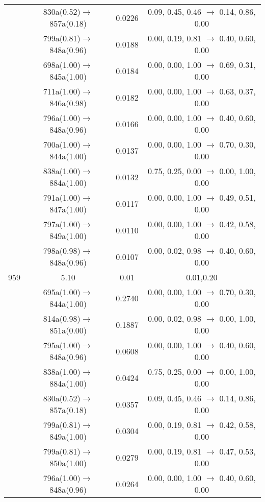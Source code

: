 \documentclass[10pt,a4paper]{article}
\begin{document}
\begin{longtable}{c|c|c|c}
 	& 830a(0.52)$\rightarrow$857a(0.18) &	 0.0226 &	 0.09, 0.45, 0.46 $\rightarrow$ 0.14, 0.86, 0.00 \\ 
 	& 799a(0.81)$\rightarrow$848a(0.96) &	 0.0188 &	 0.00, 0.19, 0.81 $\rightarrow$ 0.40, 0.60, 0.00 \\ 
 	& 698a(1.00)$\rightarrow$845a(1.00) &	 0.0184 &	 0.00, 0.00, 1.00 $\rightarrow$ 0.69, 0.31, 0.00 \\ 
 	& 711a(1.00)$\rightarrow$846a(0.98) &	 0.0182 &	 0.00, 0.00, 1.00 $\rightarrow$ 0.63, 0.37, 0.00 \\ 
 	& 796a(1.00)$\rightarrow$848a(0.96) &	 0.0166 &	 0.00, 0.00, 1.00 $\rightarrow$ 0.40, 0.60, 0.00 \\ 
 	& 700a(1.00)$\rightarrow$844a(1.00) &	 0.0137 &	 0.00, 0.00, 1.00 $\rightarrow$ 0.70, 0.30, 0.00 \\ 
 	& 838a(1.00)$\rightarrow$884a(1.00) &	 0.0132 &	 0.75, 0.25, 0.00 $\rightarrow$ 0.00, 1.00, 0.00 \\ 
 	& 791a(1.00)$\rightarrow$847a(1.00) &	 0.0117 &	 0.00, 0.00, 1.00 $\rightarrow$ 0.49, 0.51, 0.00 \\ 
 	& 797a(1.00)$\rightarrow$849a(1.00) &	 0.0110 &	 0.00, 0.00, 1.00 $\rightarrow$ 0.42, 0.58, 0.00 \\ 
 	& 798a(0.98)$\rightarrow$848a(0.96) &	 0.0107 &	 0.00, 0.02, 0.98 $\rightarrow$ 0.40, 0.60, 0.00 \\ 
 \hline959 &	 5.10 &	 0.01 &	 0.01,0.20 \\ 
  	& 695a(1.00)$\rightarrow$844a(1.00) &	 0.2740 &	 0.00, 0.00, 1.00 $\rightarrow$ 0.70, 0.30, 0.00 \\ 
 	& 814a(0.98)$\rightarrow$851a(0.00) &	 0.1887 &	 0.00, 0.02, 0.98 $\rightarrow$ 0.00, 1.00, 0.00 \\ 
 	& 795a(1.00)$\rightarrow$848a(0.96) &	 0.0608 &	 0.00, 0.00, 1.00 $\rightarrow$ 0.40, 0.60, 0.00 \\ 
 	& 838a(1.00)$\rightarrow$884a(1.00) &	 0.0424 &	 0.75, 0.25, 0.00 $\rightarrow$ 0.00, 1.00, 0.00 \\ 
 	& 830a(0.52)$\rightarrow$857a(0.18) &	 0.0357 &	 0.09, 0.45, 0.46 $\rightarrow$ 0.14, 0.86, 0.00 \\ 
 	& 799a(0.81)$\rightarrow$849a(1.00) &	 0.0304 &	 0.00, 0.19, 0.81 $\rightarrow$ 0.42, 0.58, 0.00 \\ 
 	& 799a(0.81)$\rightarrow$850a(1.00) &	 0.0279 &	 0.00, 0.19, 0.81 $\rightarrow$ 0.47, 0.53, 0.00 \\ 
 	& 796a(1.00)$\rightarrow$848a(0.96) &	 0.0264 &	 0.00, 0.00, 1.00 $\rightarrow$ 0.40, 0.60, 0.00 \\ 

\end{longtable}
\end{document}
